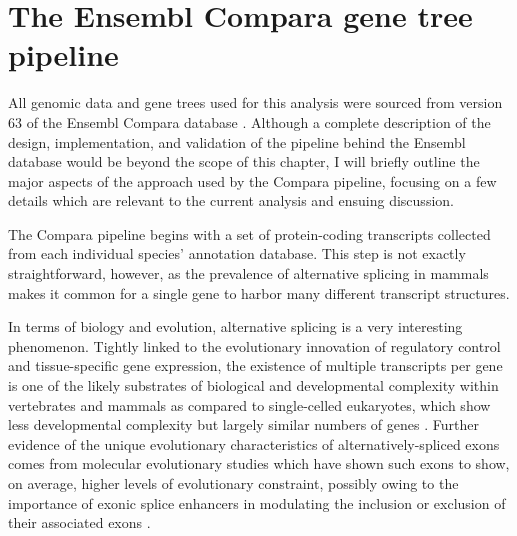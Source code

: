 \section{The Ensembl Compara gene tree pipeline}
\label{section_compara_pipeline}

All genomic data and gene trees used for this analysis were sourced
from version 63 of the Ensembl Compara database
\citep{Vilella2009,Flicek2011}. Although a complete description of the
design, implementation, and validation of the pipeline behind the
Ensembl database would be beyond the scope of this chapter, I will
briefly outline the major aspects of the approach used by the Compara
pipeline, focusing on a few details which are relevant to the current
analysis and ensuing discussion.

The Compara pipeline begins with a set of protein-coding transcripts
collected from each individual species' annotation database. This step
is not exactly straightforward, however, as the prevalence of
alternative splicing in \euth mammals makes it common for a single
gene to harbor many different transcript structures.

In terms of biology and evolution, alternative splicing is a very
interesting phenomenon. Tightly linked to the evolutionary innovation
of regulatory control and tissue-specific gene expression, the
existence of multiple transcripts per gene is one of the likely
substrates of biological and developmental complexity within
vertebrates and mammals as compared to single-celled eukaryotes, which
show less developmental complexity but largely similar numbers of
genes \citep{Csuros2011}. Further evidence of the unique evolutionary
characteristics of alternatively-spliced exons comes from molecular
evolutionary studies which have shown such exons to show, on average,
higher levels of evolutionary constraint, possibly owing to the
importance of exonic splice enhancers in modulating the inclusion or
exclusion of their associated exons \citep{Parmley2006}.

